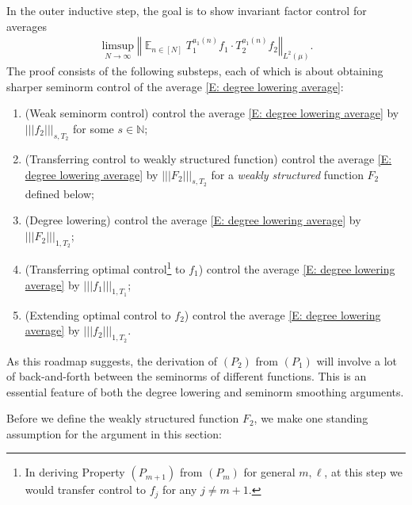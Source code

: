 \documentclass[11pt]{amsart}
\theoremstyle{definition}
\DeclareMathOperator*{\E}{\mathbb{E}}
\newcommand{\N}{{\mathbb N}}
\newcommand{\norm}[1]{\left\Vert #1\right\Vert}
\newcommand{\nnorm}[1]{\lvert\!|\!| #1|\!|\!\rvert}
\newcommand{\1}{{\mathbf{1}}}
\begin{document}
In the outer inductive step, the goal is to show invariant factor control for averages
\begin{align}\label{E: degree lowering average}
    \limsup_{N\to\infty}\norm{\E_{n\in[N]}T_1^{a_1(n)}f_1 \cdot T_2^{a_1(n)}f_2}_{L^2(\mu)}.
\end{align}
The proof consists of the following substeps, each of which is about obtaining sharper seminorm control of the average \eqref{E: degree lowering average}:
\begin{enumerate}
    \item (Weak seminorm control) control the average \eqref{E: degree lowering average} by $\nnorm{f_2}_{s, T_2}$ for some $s\in\N$;
    \item (Transferring control to weakly structured function) control the average \eqref{E: degree lowering average} by $\nnorm{F_2}_{s, T_{2}}$ for a \emph{weakly structured} function $F_2$ defined below;
    \item (Degree lowering) control the average \eqref{E: degree lowering average} by $\nnorm{F_2}_{1, T_{2}}$;
    \item (Transferring optimal control\footnote{In deriving Property $(P_{m+1})$ from $(P_m)$ for general $m,\ell$, at this step we would transfer control to $f_j$ for any $j\neq m+1$.} to $f_1$) control the average \eqref{E: degree lowering average} by $\nnorm{f_1}_{1, T_1}$;
    \item (Extending optimal control to $f_2$) control the average \eqref{E: degree lowering average} by $\nnorm{f_2}_{1, T_{2}}$.
\end{enumerate}
As this roadmap suggests, the derivation of $(P_{2})$ from $(P_1)$ will involve a lot of back-and-forth between the seminorms of different functions. This is an essential feature of both the degree lowering and seminorm smoothing arguments. 



Before we define the weakly structured function $F_2$, we make one standing assumption for the argument in this section:
\end{document}
